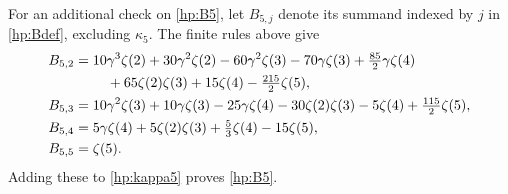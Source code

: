 \documentclass[11pt]{article}
\numberwithin{equation}{section}
\theoremstyle{plain}
\theoremstyle{definition}
\theoremstyle{remark}
\begin{document}
For an additional check on \eqref{hp:B5}, let $B_{5,j}$ denote its
summand indexed by $j$ in \eqref{hp:Bdef}, excluding $\kappa_5$.
The finite rules above give
\begin{align}\label{hp:Bpieces}
 B_{5,2}={}&10\gamma^3\zeta(2)+30\gamma^2\zeta(2)
 -60\gamma^2\zeta(3)-70\gamma\zeta(3)+\tfrac{85}{2}\gamma\zeta(4)
 \notag\\
 &\quad+65\zeta(2)\zeta(3)+15\zeta(4)-\tfrac{215}{2}\zeta(5),\notag\\
 B_{5,3}={}&10\gamma^2\zeta(3)+10\gamma\zeta(3)-25\gamma\zeta(4)
       -30\zeta(2)\zeta(3)-5\zeta(4)+\tfrac{115}{2}\zeta(5),\notag\\
 B_{5,4}={}&5\gamma\zeta(4)+5\zeta(2)\zeta(3)
                            +\tfrac53\zeta(4)-15\zeta(5),\notag\\
 B_{5,5}={}&\zeta(5).
\end{align}
Adding these to \eqref{hp:kappa5} proves \eqref{hp:B5}.
\end{document}
